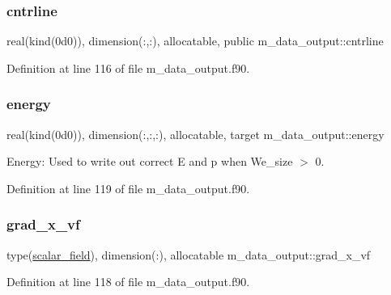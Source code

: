 \subsubsection{\texorpdfstring{cntrline}{cntrline}}
{\footnotesize\ttfamily real(kind(0d0)), dimension(\+:,\+:), allocatable, public m\+\_\+data\+\_\+output\+::cntrline}



Definition at line 116 of file m\+\_\+data\+\_\+output.\+f90.

\mbox{\label{namespacem__data__output_a8ef7ff0b857e6a25f92ddfba6ffdc731}} 
\subsubsection{\texorpdfstring{energy}{energy}}
{\footnotesize\ttfamily real(kind(0d0)), dimension(\+:,\+:,\+:), allocatable, target m\+\_\+data\+\_\+output\+::energy}



Energy\+: Used to write out correct E and p when We\+\_\+size $>$ 0. 



Definition at line 119 of file m\+\_\+data\+\_\+output.\+f90.

\mbox{\label{namespacem__data__output_a40d8d6be32c01d80e224dcae55f6ee50}} 
\subsubsection{\texorpdfstring{grad\+\_\+x\+\_\+vf}{grad\_x\_vf}}
{\footnotesize\ttfamily type(\hyperlink{structm__derived__types_1_1scalar__field}{scalar\+\_\+field}), dimension(\+:), allocatable m\+\_\+data\+\_\+output\+::grad\+\_\+x\+\_\+vf}



Definition at line 118 of file m\+\_\+data\+\_\+output.\+f90.

\mbox{\label{namespacem__data__output_ac21a93203a6e7e5bc4ffb8c1082440ae}} 
